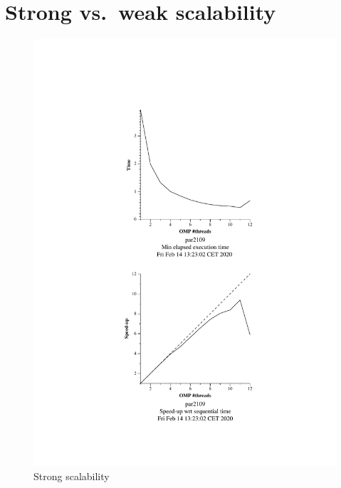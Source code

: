 
\section{Strong vs.\ weak scalability}%
\label{sec:strong_vs_weak_scalability}

\begin{figure}%
    \caption{Strong scalability}%
    \label{fig:strong}
    \centering
    \includegraphics[width=\textwidth]{./data/pi/pi_omp-1000000000-1-12-3-strong-boada-2.pdf}
\end{figure}


